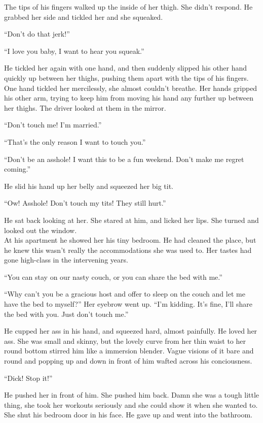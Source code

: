 \documentclass[letterpaper]{article}
\begin{document}
The tips of his fingers walked up the inside of her thigh. She didn't respond. He grabbed her side and tickled her and she squeaked.

``Don't do that jerk!''

``I love you baby, I want to hear you squeak.''

He tickled her again with one hand, and then suddenly slipped his other hand quickly up between her thighs, pushing them apart with the tips of his fingers.
One hand tickled her mercilessly, she almost couldn't breathe. Her hands gripped his other arm, trying to keep him from moving his hand any further up between her thighs.
The driver looked at them in the mirror.

``Don't touch me! I'm married.''

``That's the only reason I want to touch you.''

``Don't be an asshole! I want this to be a fun weekend. Don't make me regret coming.''

He slid his hand up her belly and squeezed her big tit.

``Ow! Asshole! Don't touch my tits! They still hurt.''

He sat back looking at her. She stared at him, and licked her lips. She turned and looked out the window.\\

At his apartment he showed her his tiny bedroom. He had cleaned the place, but he knew this wasn't really the accommodations she was used to. Her tastes had gone high-class in the intervening years.

``You can stay on our nasty couch, or you can share the bed with me.''

``Why can't you be a gracious host and offer to sleep on the couch and let me have the bed to myself?'' Her eyebrow went up. ``I'm kidding. It's fine, I'll share the bed with you. Just don't touch me.''

He cupped her ass in his hand, and squeezed hard, almost painfully. He loved her ass. She was small and skinny, but the lovely curve from her thin waist to her round bottom stirred him like a immersion blender. Vague visions of it bare and round and popping up and down in front of him wafted across his conciousness.

``Dick! Stop it!''

He pushed her in front of him. She pushed him back. Damn she was a tough little thing, she took her workouts seriously and she could show it when she wanted to. She shut his bedroom door in his face.
He gave up and went into the bathroom.
\end{document}
